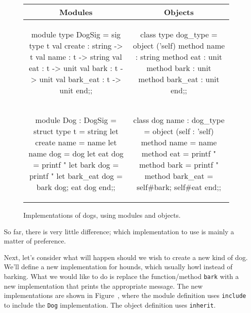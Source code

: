 \begin{figure}
\begin{center}
\begin{tabular}{c|c}
Modules & Objects\\
\hline\hline
\begin{minipage}[t]{2in}
\begin{ocamllisting}
module type DogSig = sig
   type t
   val create     : string -> t
   val name       : t -> string
   val eat        : t -> unit
   val bark       : t -> unit
   val bark_eat   : t -> unit
end;;
\end{ocamllisting}
\end{minipage}
&
\begin{minipage}[t]{2in}
\begin{ocamllisting}
class type dog_type =
  object ('self)
    method name       : string
    method eat        : unit
    method bark       : unit
    method bark_eat   : unit
  end;;
\end{ocamllisting}
\end{minipage}
\\
\begin{minipage}[t]{2in}
\begin{ocamllisting}
module Dog : DogSig = struct
   type t = string
   let create name = name
   let name dog = dog
   let eat dog =
      printf "%
   let bark dog =
      printf "%
   let bark_eat dog =
      bark dog; eat dog
end;;
\end{ocamllisting}
\end{minipage}
&
\begin{minipage}[t]{2in}
\begin{ocamllisting}
class dog name : dog_type =
  object (self : 'self)
    method name = name
    method eat =
      printf "%
    method bark =
      printf "%
    method bark_eat =
      self#bark; self#eat
  end;;
\end{ocamllisting}
\end{minipage}
\end{tabular}
\end{center}
\caption{Implementations of dogs, using modules and objects.}
\end{figure}

So far, there is very little difference; which implementation to use
is mainly a matter of preference.

Next, let's consider what will happen should we wish to create a new
kind of dog.  We'll define a new implementation for hounds, which
usually howl instead of barking.  What we would like to do is replace
the function/method \hbox{\lstinline$bark$} with a new implementation that
prints the appropriate message.  The new implementations are shown in
Figure~, where the module definition
uses \hbox{\lstinline$include$} to include the \hbox{\lstinline$Dog$}
implementation.  The object definition uses \hbox{\lstinline$inherit$}.

